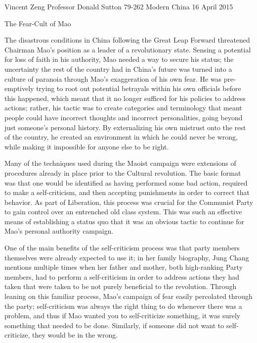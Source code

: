 Vincent Zeng
Professor Donald Sutton
79-262 Modern China
16 April 2015

The Fear-Cult of Mao

The disastrous conditions in China following the Great Leap Forward threatened
Chairman Mao's position as a leader of a revolutionary state. Sensing a
potential for loss of faith in his authority, Mao needed a way to secure his
status; the uncertainty the rest of the country had in China's future was turned
into a culture of paranoia through Mao's exaggeration of his own fear. He was
pre-emptively trying to root out potential betrayals within his own officials
before this happened, which meant that it no longer sufficed for his policies to
address actions; rather, his tactic was to create categories and terminology
that meant people could have incorrect thoughts and incorrect personalities,
going beyond just someone's personal history. By externalizing his own mistrust
onto the rest of the country, he created an environment in which he could never
be wrong, while making it impossible for anyone else to be right.

Many of the techniques used during the Maoist campaign were extensions of
procedures already in place prior to the Cultural revolution. The basic
format was that one would be identified as having performed some bad action,
required to make a self-criticism, and then accepting punishments in order
to correct that behavior. As part of Liberation, this process was crucial
for the Communist Party to gain control over an entrenched old class system.
This was such an effective means of establishing a status quo that it was an
obvious tactic to continue for Mao's personal authority campaign.

One of the main benefits of the self-criticism process was that party
members themselves were already expected to use it; in her family
biography, Jung Chang mentions multiple times when her father and
mother, both high-ranking Party members, had to perform a self-criticism
in order to address actions they had taken that were taken to be not
purely beneficial to the revolution. Through leaning on this familiar
process, Mao's campaign of fear easily percolated through the party;
self-criticism was always the right thing to do whenever there was a
problem, and thus if Mao wanted you to self-criticize something, it was
surely something that needed to be done.  Similarly, if someone did not
want to self-criticize, they would be in the wrong.

